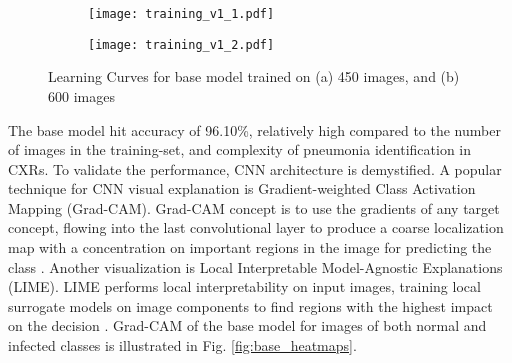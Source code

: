 \documentclass{article}
\begin{document}
\begin{figure}[H]
    \begin{subfigure}{0.5\linewidth}
        \centering
        \texttt{[image: training\_v1\_1.pdf]}
        \caption{}
        \label{fig:v1.1}
    \end{subfigure}
    \hfill
    \begin{subfigure}{0.5\linewidth}
        \centering
        \texttt{[image: training\_v1\_2.pdf]}
        \caption{}
        \label{fig:v1.2}
    \end{subfigure}
\caption{Learning Curves for base model trained on (a) 450 images, and (b) 600 images}
\label{fig:training}
\end{figure}

The base model hit accuracy of 96.10\%, relatively high compared to the number of images in the training-set, and complexity of pneumonia identification in CXRs. To validate the performance, CNN architecture is demystified. A popular technique for CNN visual explanation is Gradient-weighted Class Activation Mapping (Grad-CAM). Grad-CAM concept is to use the gradients of any target concept, flowing into the last convolutional layer to produce a coarse localization map with a concentration on important regions in the image for predicting the class \cite{selvaraju2017grad}. Another visualization is Local Interpretable Model-Agnostic Explanations (LIME). LIME performs local interpretability on input images, training local surrogate models on image components to find regions with the highest impact on the decision \cite{ribeiro2016should}. Grad-CAM of the base model for images of both normal and infected classes is illustrated in Fig. \ref{fig:base_heatmaps}. 
\end{document}
